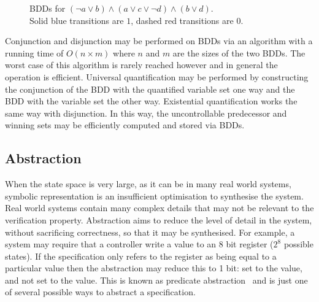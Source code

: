 \begin{figure}
\begin{subfigure}[t]{0.5\textwidth}
    \end{subfigure}
    \caption[Example BDD]{BDDs for $(\lnot a \lor b) \land (a \lor c \lor  \lnot d) \land (b \lor d)$. \\Solid blue transitions are $1$, dashed red transitions are $0$.}
    \label{fig:backgroundBDD}
\end{figure}

Conjunction and disjunction may be performed on BDDs via an algorithm with a running time of $O(n \times m)$ where $n$ and $m$ are the sizes of the two BDDs. The worst case of this algorithm is rarely reached however and in general the operation is efficient. Universal quantification may be performed by constructing the conjunction of the BDD with the quantified variable set one way and the BDD with the variable set the other way. Existential quantification works the same way with disjunction. In this way, the uncontrollable predecessor and winning sets may be efficiently computed and stored via BDDs.

\subsection{Abstraction}

When the state space is very large, as it can be in many real world systems, symbolic representation is an insufficient optimisation to synthesise the system. Real world systems contain many complex details that may not be relevant to the verification property. Abstraction aims to reduce the level of detail in the system, without sacrificing correctness, so that it may be synthesised. For example, a system may require that a controller write a value to an 8 bit register ($2^8$ possible states). If the specification only refers to the register as being equal to a particular value then the abstraction may reduce this to 1 bit: set to the value, and not set to the value. This is known as predicate abstraction~\cite{Graf97} and is just one of several possible ways to abstract a specification.

